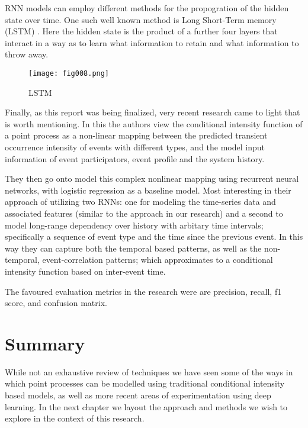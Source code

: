 RNN models can employ different methods for the propogration of the hidden state over time. One such well known method is Long Short-Term memory (LSTM) \parencite{Olah}. Here the hidden state is the product of a further four layers that interact in a way as to learn what information to retain and what information to throw away. 

\begin{figure}[h!]
	\centering
	\texttt{[image: fig008.png]}
	\caption{LSTM}
	\label{fig:fig8}
\end{figure} 

Finally, as this report was being finalized, very recent research \parencite{xiao2017modeling} came to light that is worth mentioning. In this the authors view the conditional intensity function of a point process as a non-linear mapping between the predicted transient occurrence intensity of events with different types, and the  model  input  information  of  event  participators, event
profile and the system history.

They then go onto model this complex nonlinear mapping using recurrent neural networks, with logistic regression as a baseline model. Most interesting in their approach of utilizing two RNNs: one for modeling the time-series data and associated features (similar to the approach in our research) and a second to model long-range dependency over history with arbitary time intervals; specifically a sequence of event type and the time since the previous event. In this way they can capture both the temporal based patterns, as well as the non-temporal, event-correlation patterns; which approximates to a conditional intensity function based on inter-event time.

The favoured evaluation metrics in the research were are precision, recall, f1 score, and confusion matrix.

\section{Summary}

While not an exhaustive review of techniques we have seen some of the ways in which point processes can be modelled using traditional conditional intensity based models, as well as more recent areas of experimentation using deep learning. In the next chapter we layout the approach and methods we wish to explore in the context of this research.